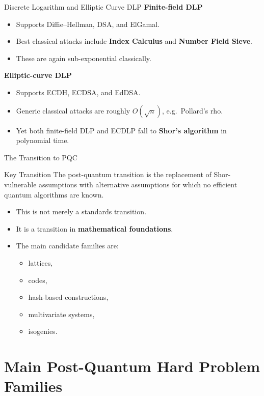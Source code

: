 \documentclass[aspectratio=169]{beamer}
\begin{document}
	\begin{frame}{Discrete Logarithm and Elliptic Curve DLP}
		\textbf{Finite-field DLP}
		\begin{itemize}
			\item Supports Diffie--Hellman, DSA, and ElGamal.
			\item Best classical attacks include \textbf{Index Calculus} and \textbf{Number Field Sieve}.
			\item These are again sub-exponential classically.
		\end{itemize}
		
		\vspace{0.5em}
		\textbf{Elliptic-curve DLP}
		\begin{itemize}
			\item Supports ECDH, ECDSA, and EdDSA.
			\item Generic classical attacks are roughly \textbf{$O(\sqrt{n})$}, e.g.\ Pollard's rho.
			\item Yet both finite-field DLP and ECDLP fall to \textbf{Shor's algorithm} in polynomial time.
		\end{itemize}
	\end{frame}
	
	\begin{frame}{The Transition to PQC}
		\begin{block}{Key Transition}
			The post-quantum transition is the replacement of Shor-vulnerable assumptions with alternative assumptions for which no efficient quantum algorithms are known.
		\end{block}
		
		\begin{itemize}
			\item This is not merely a standards transition.
			\item It is a transition in \textbf{mathematical foundations}.
			\item The main candidate families are:
			\begin{itemize}
				\item lattices,
				\item codes,
				\item hash-based constructions,
				\item multivariate systems,
				\item isogenies.
			\end{itemize}
		\end{itemize}
	\end{frame}
	
	\section{Main Post-Quantum Hard Problem Families}
	
\end{document}
